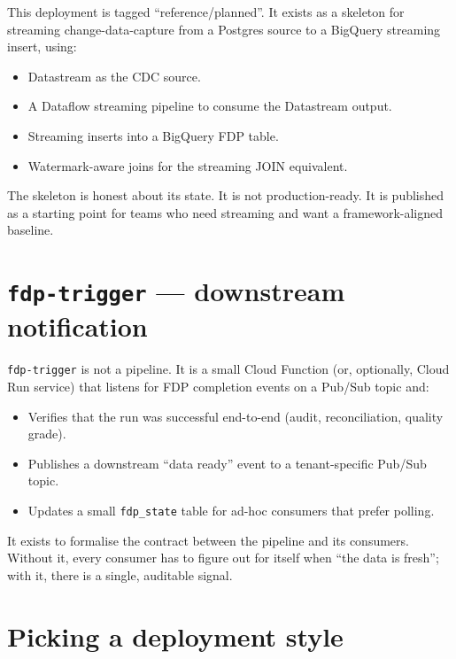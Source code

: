 \documentclass[
  11pt,
  british,
  oneside]{book}
\providecommand{\tightlist}{%
  \setlength{\itemsep}{0pt}\setlength{\parskip}{0pt}}
\begin{document}
This deployment is tagged ``reference/planned''. It exists as a skeleton
for streaming change-data-capture from a Postgres source to a BigQuery
streaming insert, using:

\begin{itemize}
\tightlist
\item
  Datastream as the CDC source.
\item
  A Dataflow streaming pipeline to consume the Datastream output.
\item
  Streaming inserts into a BigQuery FDP table.
\item
  Watermark-aware joins for the streaming JOIN equivalent.
\end{itemize}

The skeleton is honest about its state. It is not production-ready. It
is published as a starting point for teams who need streaming and want a
framework-aligned baseline.

\hypertarget{fdp-trigger-downstream-notification}{%
\section{\texorpdfstring{\texttt{fdp-trigger} --- downstream
notification}{fdp-trigger --- downstream notification}}\label{fdp-trigger-downstream-notification}}

\texttt{fdp-trigger} is not a pipeline. It is a small Cloud Function
(or, optionally, Cloud Run service) that listens for FDP completion
events on a Pub/Sub topic and:

\begin{itemize}
\tightlist
\item
  Verifies that the run was successful end-to-end (audit,
  reconciliation, quality grade).
\item
  Publishes a downstream ``data ready'' event to a tenant-specific
  Pub/Sub topic.
\item
  Updates a small \texttt{fdp\_state} table for ad-hoc consumers that
  prefer polling.
\end{itemize}

It exists to formalise the contract between the pipeline and its
consumers. Without it, every consumer has to figure out for itself when
``the data is fresh''; with it, there is a single, auditable signal.

\hypertarget{picking-a-deployment-style}{%
\section{Picking a deployment style}\label{picking-a-deployment-style}}
\end{document}
